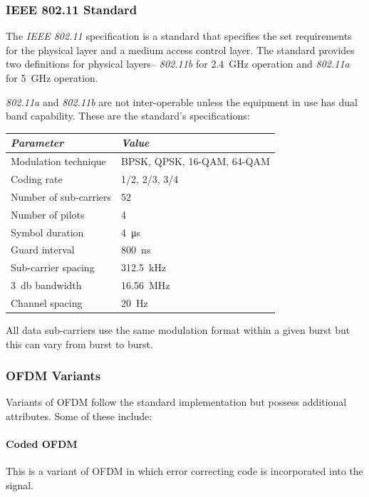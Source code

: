 \subsubsection{IEEE 802.11 Standard}
The \emph{IEEE 802.11} specification is a standard that specifies the set requirements for the physical layer and a medium access control layer. The standard provides two definitions for physical layers-- \emph{802.11b} for \SI{2.4}{\giga\hertz} operation and \emph{802.11a} for \SI{5}{\giga\hertz} operation\cite{802.11}.

\emph{802.11a} and \emph{802.11b} are not inter-operable unless the equipment in use has dual band capability. These are the standard's specifications:
\begin{table}
	\centering
	\renewcommand{\arraystretch}{1.5}
	\begin{tabular}{l l}
		\emph{Parameter} & \emph{Value}\\
		\hline
		Modulation technique & BPSK, QPSK, 16-QAM, 64-QAM \\
		Coding rate & 1/2, 2/3, 3/4 \\
		Number of sub-carriers & 52 \\
		Number of pilots & 4 \\
		Symbol duration & \SI{4}{\micro\second} \\
		Guard interval & \SI{800}{\nano\second} \\
		Sub-carrier spacing & \SI{312.5}{\kilo\hertz} \\
		\SI{3}{\decibel} bandwidth & \SI{16.56}{\mega\hertz} \\
		Channel spacing & \SI{20}{\hertz}
	\end{tabular}
	\label{tab:litRev:802.11}
\end{table}
All data sub-carriers use the same modulation format within a given burst but this can vary from burst to burst.

\subsubsection{OFDM Variants}
Variants of OFDM follow the standard implementation but possess additional attributes. Some of these include:
\paragraph{Coded OFDM} This is a variant of OFDM in which error correcting code is incorporated into the signal.
